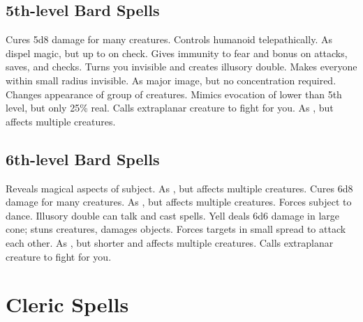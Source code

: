 \subsection{5th-level Bard Spells}
\begin{spelllist}
   Cures 5d8 damage for many creatures.
   Controls humanoid telepathically.
   As dispel magic, but up to  on check.
   Gives immunity to fear and bonus on attacks, saves, and checks.
   Turns you invisible and creates illusory double.
   Makes everyone within small radius invisible.
   As major image, but no concentration required.
   Changes appearance of group of creatures.
   Mimics evocation of lower than 5th level, but only 25\% real.
   Calls extraplanar creature to fight for you.
   As , but affects multiple creatures.
\end{spelllist}

\subsection{6th-level Bard Spells}
\begin{spelllist}
  \F Reveals magical aspects of subject.
   As , but affects multiple creatures.
   Cures 6d8 damage for many creatures.
   As , but affects multiple creatures.
   Forces subject to dance.
   Illusory double can talk and cast spells.
   Yell deals 6d6 damage in large cone; stuns creatures, damages objects.
   Forces targets in small spread to attack each other.
   As , but shorter and affects multiple creatures.
   Calls extraplanar creature to fight for you.
\end{spelllist}

\section{Cleric Spells}

